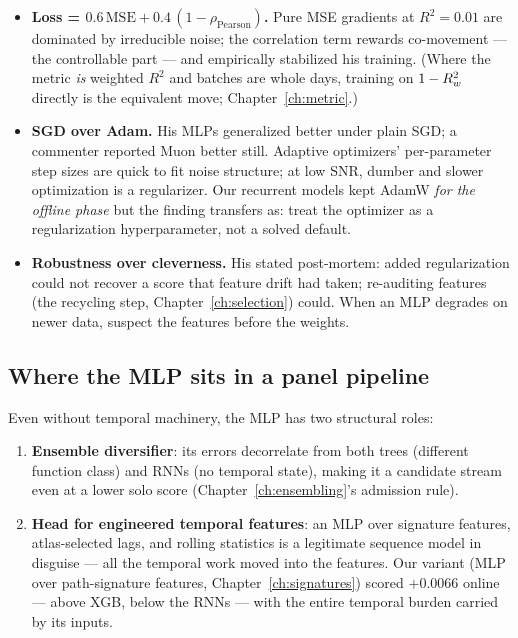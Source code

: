 \begin{itemize}
\item \textbf{Loss = $0.6\,\mathrm{MSE} + 0.4\,(1 - \rho_{\text{Pearson}})$.}
  Pure MSE gradients at $R^2 = 0.01$ are dominated by irreducible noise;
  the correlation term rewards co-movement --- the controllable part ---
  and empirically stabilized his training. (Where the metric \emph{is}
  weighted $R^2$ and batches are whole days, training on $1-R^2_{w}$ directly
  is the equivalent move; Chapter~\ref{ch:metric}.)
\item \textbf{SGD over Adam.} His MLPs generalized better under plain SGD;
  a commenter reported Muon better still. Adaptive optimizers' per-parameter
  step sizes are quick to fit noise structure; at low SNR, dumber and
  slower optimization is a regularizer. Our recurrent models kept AdamW
  \emph{for the offline phase} but the finding transfers as: treat the
  optimizer as a regularization hyperparameter, not a solved default.
\item \textbf{Robustness over cleverness.} His stated post-mortem: added
  regularization could not recover a score that feature drift had taken;
  re-auditing features (the recycling step, Chapter~\ref{ch:selection})
  could. When an MLP degrades on newer data, suspect the features before
  the weights.
\end{itemize}

\subsection{Where the MLP sits in a panel pipeline}

Even without temporal machinery, the MLP has two structural roles:

\begin{enumerate}
\item \textbf{Ensemble diversifier}: its errors decorrelate from both
  trees (different function class) and RNNs (no temporal state), making it
  a candidate stream even at a lower solo score
  (Chapter~\ref{ch:ensembling}'s admission rule).
\item \textbf{Head for engineered temporal features}: an MLP over
  signature features, atlas-selected lags, and rolling statistics is a
  legitimate sequence model in disguise --- all the temporal work moved
  into the features. Our  variant (MLP over path-signature
  features, Chapter~\ref{ch:signatures}) scored $+0.0066$ online ---
  above XGB, below the RNNs --- with the entire temporal burden carried
  by its inputs.
\end{enumerate}

